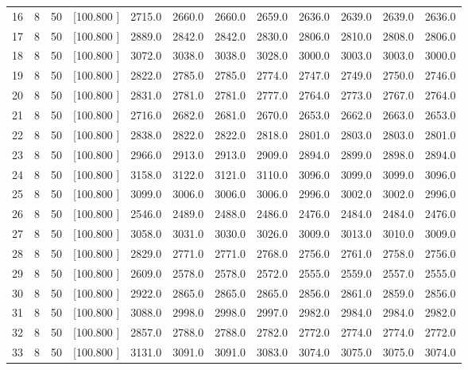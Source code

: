 \documentclass[12pt,a4paper]{article}
\begin{document}
\begin{center}
{\begin{tabular}{r r r r r r r r r r r r}
  16&  8& 50&[100.800   ]&  2715.0&  2660.0&  2660.0&  2659.0&  2636.0&  2639.0&  2639.0&  2636.0\\[-0.02in]
  17&  8& 50&[100.800   ]&  2889.0&  2842.0&  2842.0&  2830.0&  2806.0&  2810.0&  2808.0&  2806.0\\[-0.02in]
  18&  8& 50&[100.800   ]&  3072.0&  3038.0&  3038.0&  3028.0&  3000.0&  3003.0&  3003.0&  3000.0\\[-0.02in]
  19&  8& 50&[100.800   ]&  2822.0&  2785.0&  2785.0&  2774.0&  2747.0&  2749.0&  2750.0&  2746.0\\[-0.02in]
  20&  8& 50&[100.800   ]&  2831.0&  2781.0&  2781.0&  2777.0&  2764.0&  2773.0&  2767.0&  2764.0\\[-0.02in]
  21&  8& 50&[100.800   ]&  2716.0&  2682.0&  2681.0&  2670.0&  2653.0&  2662.0&  2663.0&  2653.0\\[-0.02in]
  22&  8& 50&[100.800   ]&  2838.0&  2822.0&  2822.0&  2818.0&  2801.0&  2803.0&  2803.0&  2801.0\\[-0.02in]
  23&  8& 50&[100.800   ]&  2966.0&  2913.0&  2913.0&  2909.0&  2894.0&  2899.0&  2898.0&  2894.0\\[-0.02in]
  24&  8& 50&[100.800   ]&  3158.0&  3122.0&  3121.0&  3110.0&  3096.0&  3099.0&  3099.0&  3096.0\\[-0.02in]
  25&  8& 50&[100.800   ]&  3099.0&  3006.0&  3006.0&  3006.0&  2996.0&  3002.0&  3002.0&  2996.0\\[-0.02in]
  26&  8& 50&[100.800   ]&  2546.0&  2489.0&  2488.0&  2486.0&  2476.0&  2484.0&  2484.0&  2476.0\\[-0.02in]
  27&  8& 50&[100.800   ]&  3058.0&  3031.0&  3030.0&  3026.0&  3009.0&  3013.0&  3010.0&  3009.0\\[-0.02in]
  28&  8& 50&[100.800   ]&  2829.0&  2771.0&  2771.0&  2768.0&  2756.0&  2761.0&  2758.0&  2756.0\\[-0.02in]
  29&  8& 50&[100.800   ]&  2609.0&  2578.0&  2578.0&  2572.0&  2555.0&  2559.0&  2557.0&  2555.0\\[-0.02in]
  30&  8& 50&[100.800   ]&  2922.0&  2865.0&  2865.0&  2865.0&  2856.0&  2861.0&  2859.0&  2856.0\\[-0.02in]
  31&  8& 50&[100.800   ]&  3088.0&  2998.0&  2998.0&  2997.0&  2982.0&  2984.0&  2984.0&  2982.0\\[-0.02in]
  32&  8& 50&[100.800   ]&  2857.0&  2788.0&  2788.0&  2782.0&  2772.0&  2774.0&  2774.0&  2772.0\\[-0.02in]
  33&  8& 50&[100.800   ]&  3131.0&  3091.0&  3091.0&  3083.0&  3074.0&  3075.0&  3075.0&  3074.0\\[-0.02in]

\end{tabular}}
\end{center}
\end{document}
